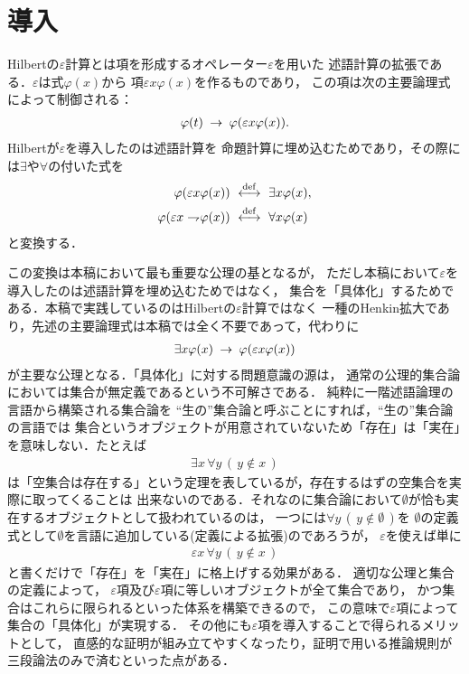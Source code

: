 \section{導入}
	Hilbertの$\varepsilon$計算とは項を形成するオペレーター$\varepsilon$を用いた
	述語計算の拡張である．$\varepsilon$は式$\varphi(x)$から
	項$\varepsilon x \varphi(x)$を作るものであり，
	この項は次の主要論理式によって制御される：
	\begin{align}
		\varphi(t) \hspace{0.25em}\rightarrow\hspace{0.25em} \varphi(\varepsilon x \varphi(x)).
	\end{align}
	Hilbertが$\varepsilon$を導入したのは述語計算を
	命題計算に埋め込むためであり，その際には$\exists$や$\forall$の付いた式を
	\begin{align}
		\varphi(\varepsilon x \varphi(x)) &\ \overset{\mathrm{def}}{\longleftrightarrow}\  \exists x \varphi(x), \\
		\varphi(\varepsilon x \rightharpoondown\hspace{-0.25em} \varphi(x)) &\ \overset{\mathrm{def}}{\longleftrightarrow}\  \forall x \varphi(x)
	\end{align}
	と変換する．
	
	この変換は本稿において最も重要な公理の基となるが，
	ただし本稿において$\varepsilon$を導入したのは述語計算を埋め込むためではなく，
	集合を「具体化」するためである．本稿で実践しているのはHilbertの$\varepsilon$計算ではなく
	一種のHenkin拡大であり，先述の主要論理式は本稿では全く不要であって，代わりに
	\begin{align}
		\exists x \varphi(x) \hspace{0.25em}\rightarrow\hspace{0.25em} \varphi(\varepsilon x \varphi(x))
	\end{align}
	が主要な公理となる．「具体化」に対する問題意識の源は，
	通常の公理的集合論においては集合が無定義であるという不可解さである．
	純粋に一階述語論理の言語から構築される集合論を
	``生の''集合論と呼ぶことにすれば，``生の''集合論の言語では
	集合というオブジェクトが用意されていないため「存在」は「実在」を意味しない．たとえば
	\begin{align}
		\exists x\, \forall y\, (\, y \notin x\, )
	\end{align}
	は「空集合は存在する」という定理を表しているが，存在するはずの空集合を実際に取ってくることは
	出来ないのである．それなのに集合論において$\emptyset$が恰も実在するオブジェクトとして扱われているのは，
	一つには$\forall y\, (\, y \notin \emptyset\, )$を
	$\emptyset$の定義式として$\emptyset$を言語に追加している(定義による拡張)のであろうが，
	$\varepsilon$を使えば単に
	\begin{align}
		\varepsilon x\, \forall y\, (\, y \notin x\, )
	\end{align}
	と書くだけで「存在」を「実在」に格上げする効果がある．
	適切な公理と集合の定義によって，
	$\varepsilon$項及び$\varepsilon$項に等しいオブジェクトが全て集合であり，
	かつ集合はこれらに限られるといった体系を構築できるので，
	この意味で$\varepsilon$項によって集合の「具体化」が実現する．
	その他にも$\varepsilon$項を導入することで得られるメリットとして，
	直感的な証明が組み立てやすくなったり，証明で用いる推論規則が三段論法のみで済むといった点がある．
	
